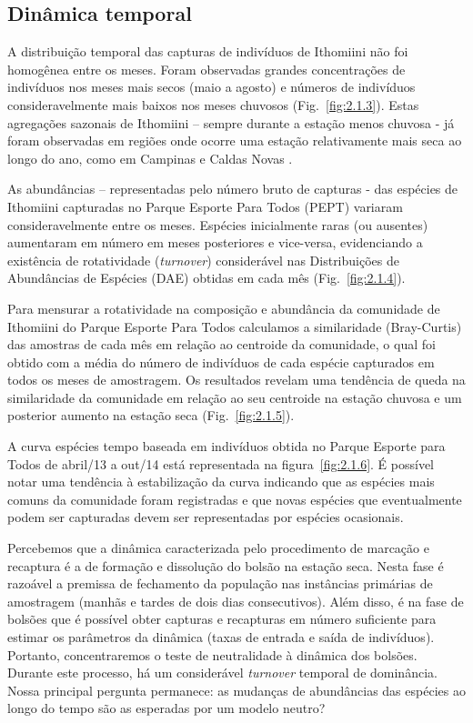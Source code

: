 \documentclass[12pt, A4]{article}
\begin{document}
\subsection{Dinâmica temporal}
\label{sec:din-temp-borb}
A distribuição temporal das capturas de indivíduos de Ithomiini não
foi homogênea entre os meses. Foram observadas grandes concentrações
de indivíduos nos meses mais secos (maio a agosto) e números de
indivíduos consideravelmente mais baixos nos meses chuvosos
(Fig.~\ref{fig:2.1.3}). Estas agregações sazonais de Ithomiini –
sempre durante a estação menos chuvosa - já foram observadas em
regiões onde ocorre uma estação relativamente mais seca ao longo do
ano, como em Campinas \citep{brown2002} e Caldas Novas
\citep{Pinheiro_2008}.

As abundâncias – representadas pelo número bruto de capturas - das
espécies de Ithomiini capturadas no Parque Esporte Para Todos (PEPT)
variaram consideravelmente entre os meses. Espécies inicialmente raras
(ou ausentes) aumentaram em número em meses posteriores e vice-versa,
evidenciando a existência de rotatividade (\emph{turnover}) considerável nas
Distribuições de Abundâncias de Espécies (DAE) obtidas em cada mês
(Fig.~\ref{fig:2.1.4}).

Para mensurar a rotatividade na composição e
abundância da comunidade de Ithomiini do Parque Esporte Para Todos
calculamos a similaridade (Bray-Curtis) das amostras de cada mês em
relação ao centroide da comunidade, o qual foi obtido com a
média do número de indivíduos de cada espécie capturados em todos os
meses de amostragem. Os resultados revelam uma tendência de queda na
similaridade da comunidade em relação ao seu centroide na estação
chuvosa e um posterior aumento na estação seca (Fig.~\ref{fig:2.1.5}).

A curva espécies tempo baseada em indivíduos obtida no Parque Esporte
para Todos de abril/13 a out/14 está representada na
figura~\ref{fig:2.1.6}. É possível notar uma tendência à estabilização
da curva indicando que as espécies mais comuns da comunidade foram
registradas e que novas espécies que eventualmente podem ser
capturadas devem ser representadas por espécies ocasionais.

Percebemos que a dinâmica caracterizada pelo procedimento de marcação e recaptura
é a de formação e dissolução do bolsão na estação seca. 
Nesta fase é razoável a premissa de fechamento da população nas instâncias primárias
de amostragem (manhãs e tardes de dois dias consecutivos). Além disso, é na fase de bolsões
que é possível obter capturas e recapturas em número suficiente para estimar os parâmetros
da dinâmica (taxas de entrada e saída de indivíduos). Portanto, concentraremos 
o teste de neutralidade à dinâmica dos bolsões. 
Durante este processo, há um considerável \emph{turnover} temporal de dominância.
Nossa principal pergunta permanece: as mudanças de abundâncias das espécies ao longo
do tempo são as esperadas por um modelo neutro?
\end{document}
